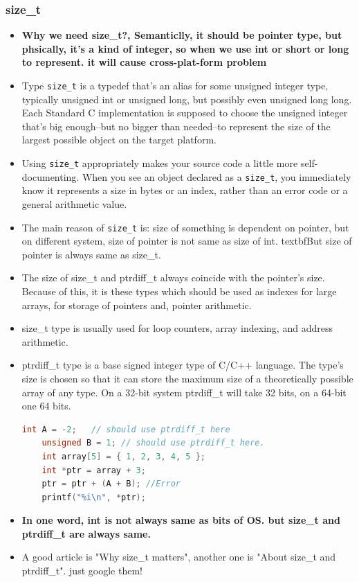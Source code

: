 \documentclass[a4paper,11pt,twoside]{book}
\begin{document}
\subsubsection{size\_t}
\begin{itemize}
	\item \textbf{Why we need size\_t?, Semanticlly, it should be pointer type, but phsically, it's a kind of integer, so when we use int or short or long to represent. it will cause cross-plat-form problem}
	
	\item Type \texttt{size\_t} is a typedef that's an alias for some unsigned integer type, typically unsigned int or unsigned long, but possibly even unsigned long long. Each Standard C implementation is supposed to choose the unsigned integer that's big enough--but no bigger than needed--to represent the size of the largest possible object on the target platform.
	
	\item Using \texttt{size\_t} appropriately makes your source code a little more self-documenting. When you see an object declared as a \texttt{size\_t}, you immediately know it represents a size in bytes or an index, rather than an error code or a general arithmetic value.
	
	\item The main reason of \texttt{size\_t} is: size of something is dependent on pointer, but on different system, size of pointer is not same as size of int.  textbf{But size of pointer is always same as size\_t}.
	
	\item The size of size\_t and ptrdiff\_t always coincide with the pointer's size. Because of this, it is these types which should be used as indexes for large arrays, for storage of pointers and, pointer arithmetic.
	
	\item size\_t type is usually used for loop counters, array indexing, and address arithmetic.
	
	\item ptrdiff\_t type is a base signed integer type of C/C++ language. The type's size is chosen so that it can store the maximum size of a theoretically possible array of any type. On a 32-bit system ptrdiff\_t will take 32 bits, on a 64-bit one 64 bits.
	\begin{lstlisting}[frame=single, language=c++]
	int A = -2;   // should use ptrdiff_t here
	unsigned B = 1; // should use ptrdiff_t here.
	int array[5] = { 1, 2, 3, 4, 5 };
	int *ptr = array + 3;
	ptr = ptr + (A + B); //Error
	printf("%i\n", *ptr);
	\end{lstlisting}
	
	\item \textbf{In one word, int is not always same as bits of OS. but size\_t and ptrdiff\_t are always same.}
	
	\item A good article is "Why size\_t matters", another one is "About size\_t and ptrdiff\_t". just google them!   
\end{itemize}
\end{document}
